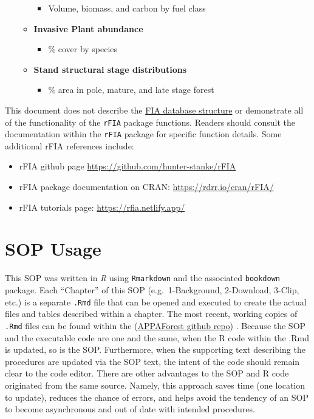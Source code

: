 \documentclass[
]{book}
\providecommand{\tightlist}{%
  \setlength{\itemsep}{0pt}\setlength{\parskip}{0pt}}
\begin{document}
\begin{enumerate}
\begin{itemize}
    \begin{itemize}
    \tightlist
    \item
      Volume, biomass, and carbon by fuel class
    \end{itemize}
  \item
    \textbf{Invasive Plant abundance}

    \begin{itemize}
    \tightlist
    \item
      \% cover by species
    \end{itemize}
  \item
    \textbf{Stand structural stage distributions}

    \begin{itemize}
    \tightlist
    \item
      \% area in pole, mature, and late stage forest
    \end{itemize}
  \end{itemize}
\end{enumerate}

This document does not describe the \href{https://apps.fs.usda.gov/fia/datamart/datamart.html}{FIA database structure} or demonstrate all of the functionality of the \texttt{rFIA} package functions. Readers should consult the documentation within the \texttt{rFIA} package for specific function details. Some additional rFIA references include:

\begin{itemize}
\item
  rFIA github page \url{https://github.com/hunter-stanke/rFIA}
\item
  rFIA package documentation on CRAN: \url{https://rdrr.io/cran/rFIA/}
\item
  rFIA tutorials page: \url{https://rfia.netlify.app/}
\end{itemize}

\hypertarget{sop-usage}{%
\section{SOP Usage}\label{sop-usage}}

This SOP was written in \emph{R} using \texttt{Rmarkdown} and the associated \texttt{bookdown} package. Each ``Chapter'' of this SOP (e.g.~1-Background, 2-Download, 3-Clip, etc.) is a separate \texttt{.Rmd} file that can be opened and executed to create the actual files and tables described within a chapter. The most recent, working copies of \texttt{.Rmd} files can be found within the (\href{https://github.com/aaronweed/APPAForest}{APPAForest github repo}) . Because the SOP and the executable code are one and the same, when the R code within the .Rmd is updated, so is the SOP. Furthermore, when the supporting text describing the procedures are updated via the SOP text, the intent of the code should remain clear to the code editor. There are other advantages to the SOP and R code originated from the same source. Namely, this approach saves time (one location to update), reduces the chance of errors, and helps avoid the tendency of an SOP to become asynchronous and out of date with intended procedures.
\end{document}
